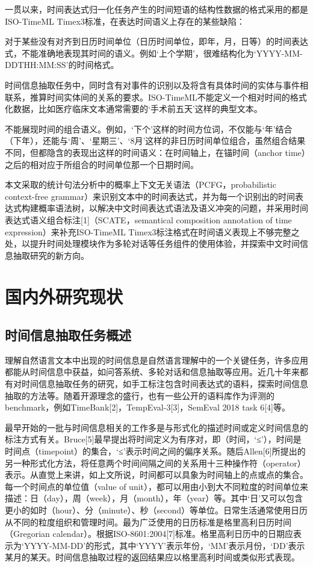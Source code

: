 一贯以来，时间表达式归一化任务产生的时间短语的结构性数据的格式采用的都是ISO-TimeML Timex3标准，在表达时间语义上存在的某些缺陷：

对于某些没有对齐到日历时间单位（日历时间单位，即年，月，日等）的时间表达式，不能准确地表现其时间的语义。例如‘上个学期’，很难结构化为‘YYYY-MM-DDTHH:MM:SS’的时间格式。

时间信息抽取任务中，同时含有对事件的识别以及将含有具体时间的实体与事件相联系，推算时间实体间的关系的要求。ISO-TimeML不能定义一个相对时间的格式化数据，比如医疗临床文本通常需要的‘手术前五天’这样的典型文本。

不能展现时间的组合语义。例如，‘下个’这样的时间方位词，不仅能与‘年’结合（下年），还能与‘周’、‘星期三’、‘8月’这样的非日历时间单位组合，虽然组合结果不同，但都隐含的表现出这样的时间语义：在时间轴上，在锚时间（anchor time）之后的相对应于所组合的时间单位那一个日期时间。

本文采取的统计句法分析中的概率上下文无关语法（PCFG，probabilistic context-free grammar）来识别文本中的时间表达式，并为每一个识别出的时间表达式构建概率语法树，以解决中文时间表达式语法及语义冲突的问题，并采用时间表达式语义组合标注[1]（SCATE，semantical composition annotation of time expression）来补充ISO-TimeML Timex3标注格式在时间语义表现上不够完整之处，以提升时间处理模块作为多轮对话等任务组件的使用体验，并探索中文时间信息抽取研究的新方向。

\section{国内外研究现状}

\subsection{时间信息抽取任务概述}

理解自然语言文本中出现的时间信息是自然语言理解中的一个关键任务，许多应用都能从时间信息中获益，如问答系统、多轮对话和信息抽取等应用。近几十年来都有对时间信息抽取任务的研究，如手工标注包含时间表达式的语料，探索时间信息抽取的方法等。随着开源理念的盛行，也有一些公开的语料库作为评测的benchmark，例如TimeBank[2]，TempEval-3[3]，SemEval 2018 task 6[4]等。

最早开始的一批与时间信息相关的工作多是与形式化的描述时间或定义时间信息的标注方式有关。Bruce[5]最早提出将时间定义为有序对，即（时间，‘≤’），时间是时间点（timepoint）的集合，‘≤’表示时间之间的偏序关系。随后Allen[6]所提出的另一种形式化方法，将任意两个时间间隔之间的关系用十三种操作符（operator）表示。从直觉上来讲，如上文所说，时间都可以具象为时间轴上的点或点的集合。每一个时间点的单位值（value of unit），都可以用由小到大不同粒度的时间单位来描述：日（day），周（week），月（month），年（year）等。其中‘日’又可以包含更小的如时（hour）、分（minute）、秒（second）等单位。日常生活通常使用日历从不同的粒度组织和管理时间。最为广泛使用的日历标准是格里高利日历时间（Gregorian calendar）。根据ISO-8601:2004[7]标准。格里高利日历中的日期应表示为‘YYYY-MM-DD’的形式，其中‘YYYY’表示年份，‘MM’表示月份，‘DD’表示某月的某天。时间信息抽取过程的返回结果应以格里高利时间或类似形式表现。

